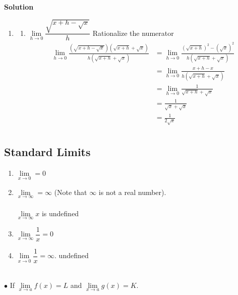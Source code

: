 \documentclass[11pt,a4paper]{article}
\begin{document}
\vspace{0.5cm}

\textbf{Solution}

\begin{enumerate}
\item[]
\begin{enumerate}
       \item $\lim\limits_{h\longrightarrow 0}\dfrac{\sqrt{x+h-\sqrt{x}}}{h}$ Rationalize the numerator
\begin{align*}
\lim_{h\longrightarrow 0}\frac{(\sqrt{x+h-\sqrt{x}})(\sqrt{x+h}+\sqrt{x})}{h(\sqrt{x+h}+\sqrt{x})} & =\lim_{h\longrightarrow 0}\frac{(\sqrt{x+h})^2-(\sqrt{x})^2}{h(\sqrt{x+h}+\sqrt{x})}\\
& =\lim_{h\longrightarrow 0}\frac{x+h-x}{h(\sqrt{x+h}+\sqrt{x})}\\
& =\lim_{h\longrightarrow 0}\frac{1}{\sqrt{x+h}+\sqrt{x}}\\
& = \frac{1}{\sqrt{x}+\sqrt{x}}\\
& = \frac{1}{2\sqrt{x}}\\
\end{align*}
\end{enumerate}
\end{enumerate}


\subsection{Standard Limits}
\begin{enumerate}
\item $\lim\limits_{x\longrightarrow 0}=0$
\item $\lim\limits_{x\longrightarrow \infty}=\infty$ (Note that $\infty$ is not a real number).\\\\
$\lim\limits_{x\longrightarrow \infty}x$ is undefined
\item $\lim\limits_{x\longrightarrow \infty} \dfrac{1}{x}=0$
\item $\lim\limits_{x\longrightarrow 0}\dfrac{1}{x}=\infty$. undefined\\\\
\end{enumerate}

$\bullet$ If $\lim\limits_{x\longrightarrow a}f(x)=L$ and $\lim\limits_{x\longrightarrow a}g(x)=K.$\\
\end{document}
